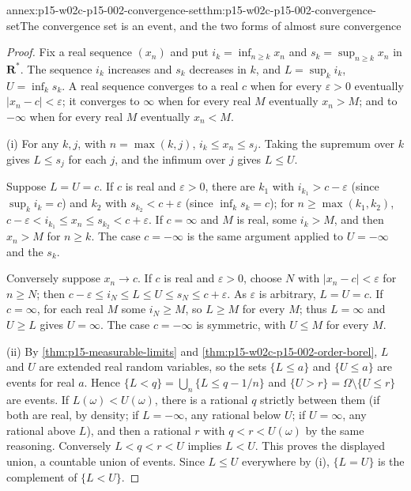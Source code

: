 \begin{annexitem}{annex:p15-w02c-p15-002-convergence-set}{thm:p15-w02c-p15-002-convergence-set}{The convergence set is an event, and the two forms of almost sure convergence}
\begin{proof}
Fix a real sequence \((x_n)\) and put \(i_k=\inf_{n\geq k}x_n\) and
\(s_k=\sup_{n\geq k}x_n\) in \(\mathbf R^*\). The sequence \(i_k\)
increases and \(s_k\) decreases in \(k\), and
\(L=\sup_ki_k\), \(U=\inf_ks_k\). A real sequence converges to a real
\(c\) when for every \(\varepsilon>0\) eventually \(|x_n-c|<\varepsilon\);
it converges to \(\infty\) when for every real \(M\) eventually
\(x_n>M\); and to \(-\infty\) when for every real \(M\) eventually
\(x_n<M\).

(i) For any \(k,j\), with \(n=\max(k,j)\),
\(i_k\leq x_n\leq s_j\). Taking the supremum over \(k\) gives
\(L\leq s_j\) for each \(j\), and the infimum over \(j\) gives
\(L\leq U\).

Suppose \(L=U=c\). If \(c\) is real and \(\varepsilon>0\), there are
\(k_1\) with \(i_{k_1}>c-\varepsilon\) (since \(\sup_ki_k=c\)) and \(k_2\)
with \(s_{k_2}<c+\varepsilon\) (since \(\inf_ks_k=c\)); for
\(n\geq\max(k_1,k_2)\),
\(c-\varepsilon<i_{k_1}\leq x_n\leq s_{k_2}<c+\varepsilon\). If
\(c=\infty\) and \(M\) is real, some \(i_k>M\), and then \(x_n>M\) for
\(n\geq k\). The case \(c=-\infty\) is the same argument applied to
\(U=-\infty\) and the \(s_k\).

Conversely suppose \(x_n\to c\). If \(c\) is real and \(\varepsilon>0\),
choose \(N\) with \(|x_n-c|<\varepsilon\) for \(n\geq N\); then
\(c-\varepsilon\leq i_N\leq L\leq U\leq s_N\leq c+\varepsilon\). As
\(\varepsilon\) is arbitrary, \(L=U=c\). If \(c=\infty\), for each real
\(M\) some \(i_N\geq M\), so \(L\geq M\) for every \(M\); thus \(L=\infty\)
and \(U\geq L\) gives \(U=\infty\). The case \(c=-\infty\) is symmetric,
with \(U\leq M\) for every \(M\).

(ii) By \cref{thm:p15-measurable-limits} and
\cref{thm:p15-w02c-p15-002-order-borel}, \(L\) and \(U\) are extended
real random variables, so the sets \(\{L\leq a\}\) and \(\{U\leq a\}\)
are events for real \(a\). Hence
\(\{L<q\}=\bigcup_n\{L\leq q-1/n\}\) and
\(\{U>r\}=\Omega\setminus\{U\leq r\}\) are events. If \(L(\omega)<U(\omega)\),
there is a rational \(q\) strictly between them (if both are real, by
density; if \(L=-\infty\), any rational below \(U\); if \(U=\infty\), any
rational above \(L\)), and then a rational \(r\) with \(q<r<U(\omega)\) by
the same reasoning. Conversely \(L<q<r<U\) implies \(L<U\). This proves
the displayed union, a countable union of events. Since \(L\leq U\)
everywhere by (i), \(\{L=U\}\) is the complement of \(\{L<U\}\).


\end{proof}
\end{annexitem}
